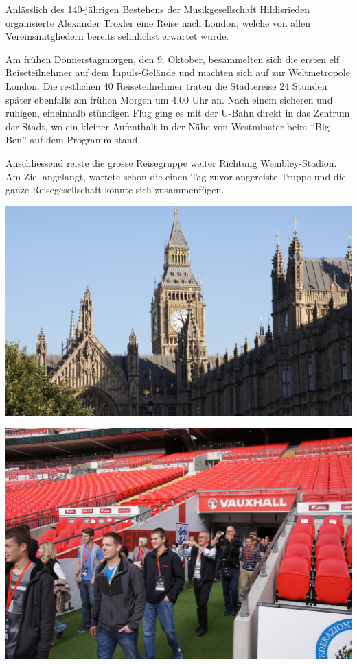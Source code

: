 \begin{history}

    Anlässlich des 140-jährigen Bestehens der Musikgesellschaft Hildisrieden
    organisierte Alexander Troxler eine Reise nach London, welche von allen
    Vereinsmitgliedern bereits sehnlichst erwartet wurde.

    Am frühen Donnerstagmorgen, den 9. Oktober, besammelten sich die ersten elf
    Reiseteilnehmer auf dem Inpuls-Gelände und machten sich auf zur
    Weltmetropole London. Die restlichen 40 Reiseteilnehmer traten die
    Städtereise 24 Stunden später ebenfalls am frühen Morgen um 4.00 Uhr an.
    Nach einem sicheren und ruhigen, eineinhalb stündigen Flug ging es mit der
    U-Bahn direkt in das Zentrum der Stadt, wo ein kleiner Aufenthalt in der
    Nähe von Westminster beim \enquote{Big Ben} auf dem Programm stand.

    Anschliessend reiste die grosse Reisegruppe weiter Richtung Wembley-Stadion.
    Am Ziel angelangt, wartete schon die einen Tag zuvor angereiste Truppe und
    die ganze Reisegesellschaft konnte sich zusammenfügen.

    \begin{MulticolFigure}
        \centering
        \includegraphics[width=0.93\linewidth]{./chap/2001-2024/2014/Westminster.jpg}
    \end{MulticolFigure}

    \begin{MulticolFigure}
        \centering
        \includegraphics[width=0.93\linewidth]{./chap/2001-2024/2014/Einmarsch-Wembley.jpg}
    \end{MulticolFigure}


\end{history}
